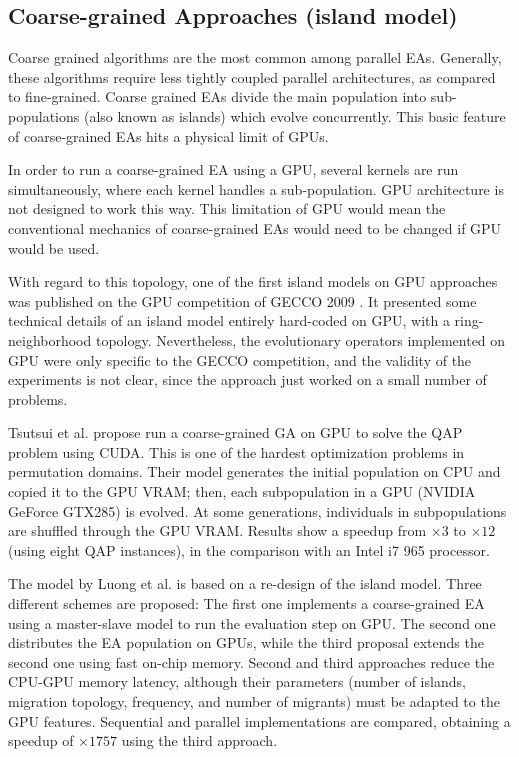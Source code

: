 \documentclass[review]{elsarticle}
\begin{document}
\subsection{Coarse-grained Approaches (island model)}

Coarse grained algorithms are the most common among parallel EAs. Generally, these algorithms require less tightly coupled parallel architectures, as compared to fine-grained. Coarse grained EAs divide the main population into sub-populations (also known as islands) which evolve concurrently. This basic feature of coarse-grained EAs hits a physical limit of GPUs. 

In order to run a coarse-grained EA using a GPU, several kernels are run simultaneously, where each kernel handles a sub-population. GPU architecture is not designed to work this way. This limitation of GPU would mean the conventional mechanics of coarse-grained EAs would need to be changed if GPU would be used.

With regard to this topology, one of the first island models on GPU approaches was published on the GPU competition of GECCO 2009 \cite{gecco2009CompetitionPospichal}. It presented some technical details of an island model entirely hard-coded on GPU, with a ring-neighborhood topology. Nevertheless, the evolutionary operators implemented on GPU were only specific to the GECCO competition, and the validity of the experiments is not clear, since the approach just worked on a small number of problems.

Tsutsui et al. \cite{1570355} propose run a coarse-grained GA on GPU to solve the QAP problem using CUDA. This is one of the hardest optimization problems in permutation domains. 
Their model generates the initial population on CPU and copied it to the GPU VRAM; then, each subpopulation in a GPU (NVIDIA GeForce GTX285) is evolved. At some generations, individuals in subpopulations are shuffled through the GPU VRAM. Results show a speedup from $\times3$ to $\times12$ (using eight QAP instances), in the comparison with an Intel i7 965 processor. 

The model by Luong et al. \cite{LUONG:2010:INRIA-00520464:1} is based on a re-design of the island model.
Three different schemes are proposed: The first one implements a coarse-grained EA using a master-slave model to run the evaluation step on GPU. The second one distributes the EA population on GPUs, while the third proposal extends the second one using fast on-chip memory. 
Second and third approaches reduce the CPU-GPU memory latency, although their parameters (number of islands, migration topology, frequency, and number of migrants) must be adapted to the GPU features. 
Sequential and parallel implementations are compared, obtaining a speedup of $\times1757$ using the third approach.
\end{document}
